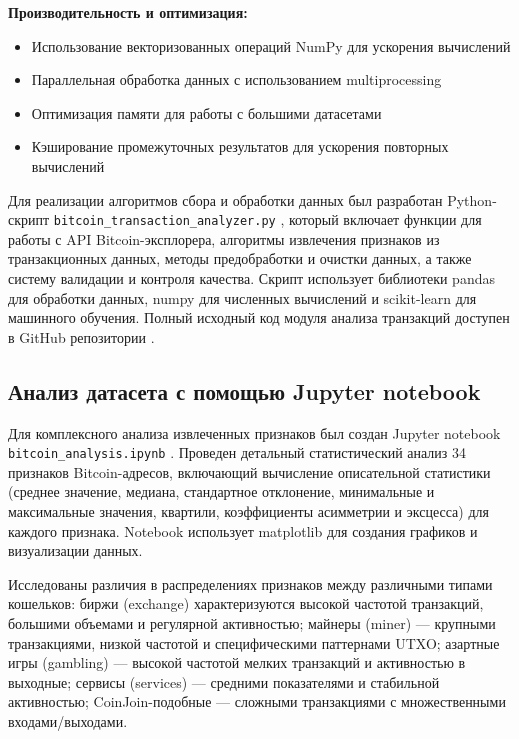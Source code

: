 \textbf{Производительность и оптимизация:}
\begin{itemize}
    \item Использование векторизованных операций NumPy для ускорения вычислений
    \item Параллельная обработка данных с использованием multiprocessing
    \item Оптимизация памяти для работы с большими датасетами
    \item Кэширование промежуточных результатов для ускорения повторных вычислений
\end{itemize}

Для реализации алгоритмов сбора и обработки данных был разработан Python-скрипт \texttt{bitcoin\_transaction\_analyzer.py} \cite{python_handbook}, который включает функции для работы с API Bitcoin-эксплорера, алгоритмы извлечения признаков из транзакционных данных, методы предобработки и очистки данных, а также систему валидации и контроля качества. Скрипт использует библиотеки pandas \cite{pandas_guide} для обработки данных, numpy \cite{numpy_guide} для численных вычислений и scikit-learn \cite{scikit_learn} для машинного обучения. Полный исходный код модуля анализа транзакций доступен в GitHub репозитории \cite{github_repo}.

\subsection{Анализ датасета с помощью Jupyter notebook}

Для комплексного анализа извлеченных признаков был создан Jupyter notebook \texttt{bitcoin\_analysis.ipynb} \cite{jupyter_documentation}. Проведен детальный статистический анализ 34 признаков Bitcoin-адресов, включающий вычисление описательной статистики (среднее значение, медиана, стандартное отклонение, минимальные и максимальные значения, квартили, коэффициенты асимметрии и эксцесса) для каждого признака. Notebook использует matplotlib \cite{matplotlib_guide} для создания графиков и визуализации данных.

Исследованы различия в распределениях признаков между различными типами кошельков: биржи (exchange) характеризуются высокой частотой транзакций, большими объемами и регулярной активностью; майнеры (miner) — крупными транзакциями, низкой частотой и специфическими паттернами UTXO; азартные игры (gambling) — высокой частотой мелких транзакций и активностью в выходные; сервисы (services) — средними показателями и стабильной активностью; CoinJoin-подобные — сложными транзакциями с множественными входами/выходами.

